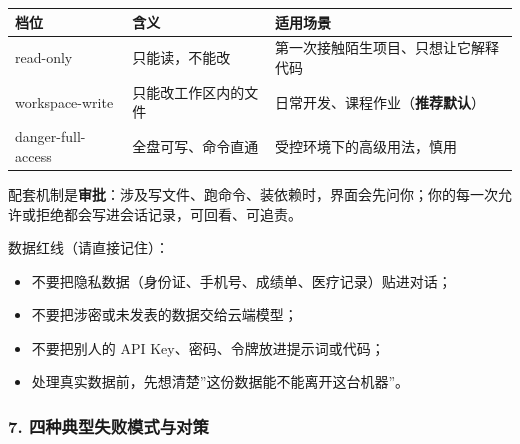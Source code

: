 \documentclass[
]{article}
\newcounter{none} %
\providecommand{\tightlist}{%
  \setlength{\itemsep}{0pt}\setlength{\parskip}{0pt}}
\begin{document}
{\def\LTcaptype{none} %
\begin{longtable}[]{@{}
  >{\raggedright\arraybackslash}p{}
  >{\raggedright\arraybackslash}p{}
  >{\raggedright\arraybackslash}p{}@{}}
\toprule\noalign{}
\begin{minipage}[b]{\linewidth}\raggedright
档位
\end{minipage} & \begin{minipage}[b]{\linewidth}\raggedright
含义
\end{minipage} & \begin{minipage}[b]{\linewidth}\raggedright
适用场景
\end{minipage} \\
\midrule\noalign{}
\endhead
\bottomrule\noalign{}
\endlastfoot
read-only & 只能读，不能改 & 第一次接触陌生项目、只想让它解释代码 \\
workspace-write & 只能改工作区内的文件 &
日常开发、课程作业（\textbf{推荐默认}） \\
danger-full-access & 全盘可写、命令直通 & 受控环境下的高级用法，慎用 \\
\end{longtable}
}

配套机制是\textbf{审批}：涉及写文件、跑命令、装依赖时，界面会先问你；你的每一次允许或拒绝都会写进会话记录，可回看、可追责。

数据红线（请直接记住）：

\begin{itemize}
\tightlist
\item
  不要把隐私数据（身份证、手机号、成绩单、医疗记录）贴进对话；
\item
  不要把涉密或未发表的数据交给云端模型；
\item
  不要把别人的 API Key、密码、令牌放进提示词或代码；
\item
  处理真实数据前，先想清楚''这份数据能不能离开这台机器''。
\end{itemize}

\subsubsection{7.
四种典型失败模式与对策}\label{ux56dbux79cdux5178ux578bux5931ux8d25ux6a21ux5f0fux4e0eux5bf9ux7b56}
\end{document}
